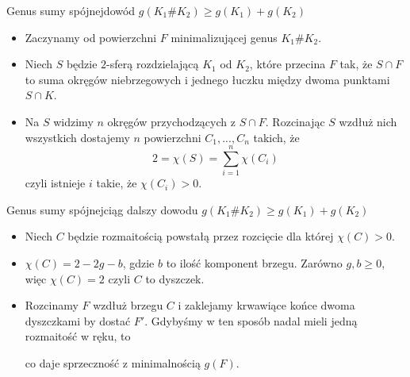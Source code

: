
\begin{frame}{Genus sumy spójnej}{dowód $g(K_1\# K_2) \geq g(K_1)+g(K_2)$}
  \begin{itemize}
    \item Zaczynamy od powierzchni $F$ minimalizującej genus $K_1\# K_2$.

    \item Niech $S$ będzie $2$-sferą rozdzielającą $K_1$ od $K_2$, które przecina $F$ tak, że $S\cap F$ to suma okręgów niebrzegowych i jednego łuczku między dwoma punktami $S\cap K$.
    \item Na $S$ widzimy $n$ okręgów przychodzących z $S\cap F$. Rozcinając $S$ wzdłuż nich wszystkich dostajemy $n$ powierzchni $C_1,..., C_n$ takich, że 
      $$2=\chi(S)=\sum_{i=1}^n\chi(C_i)$$
      czyli istnieje $i$ takie, że $\chi(C_i)>0$.
  \end{itemize}
\end{frame}

\begin{frame}{Genus sumy spójnej}{ciąg dalszy dowodu $g(K_1\# K_2) \geq g(K_1)+g(K_2)$}
  \begin{itemize}
    \item Niech $C$ będzie rozmaitością powstałą przez rozcięcie dla której $\chi(C)>0$.
    \item $\chi(C)=2-2g-b$, gdzie $b$ to ilość komponent brzegu. Zarówno $g,b\geq 0$, więc $\chi(C)=2$ czyli $C$ to dyszczek.
    \item Rozcinamy $F$ wzdłuż brzegu $C$ i zaklejamy krwawiące końce dwoma dyszczkami by dostać $F'$. Gdybyśmy w ten sposób nadal mieli jedną rozmaitość w ręku, to 
      \begin{center}
      \end{center}
      co daje sprzeczność z minimalnością $g(F)$.
  \end{itemize}
\end{frame}

